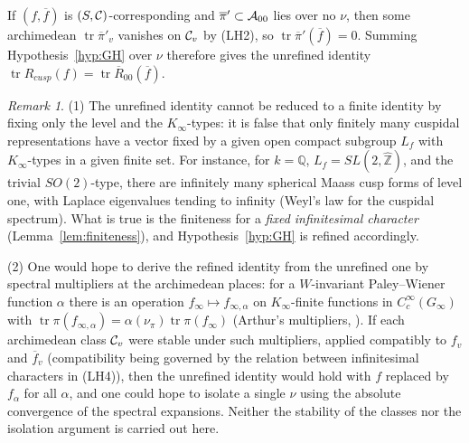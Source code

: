\documentclass[12pt,letterpaper,openany]{book}
\theoremstyle{plain}
\theoremstyle{definition}
\theoremstyle{remark}
\newtheorem{remark}[theorem]{Remark}
\theoremstyle{remark}
\newcommand{\tr}{\operatorname{tr}}
\begin{document}
If $(f,\overline f)$ is $(S,{\cal C})$-corresponding and
$\overline\pi'\subset{\cal A}_{00}$
lies over no $\nu$, then some archimedean $\tr\overline\pi'_v$ vanishes on
${\cal C}_v$ by (LH2), so $\tr\overline\pi'(\overline f)=0$. Summing
Hypothesis~\ref{hyp:GH} over $\nu$ therefore gives
the unrefined identity $\tr R_{cusp}(f)=\tr\overline R_{00}(\overline f)$.

\begin{remark}\label{rem:why-refine}
(1) The unrefined identity cannot be reduced to a finite identity by
fixing only the level and the $K_\infty$-types: it is false that only
finitely many cuspidal representations have a vector fixed by a given
open compact subgroup $L_f$ with $K_\infty$-types in a given finite set.
For instance, for $k={\mathbb Q}$, $L_f=SL(2,\widehat{\mathbb Z})$, and the
trivial $SO(2)$-type, there are infinitely many spherical Maass cusp forms
of level one, with Laplace eigenvalues tending to infinity (Weyl's law
for the cuspidal spectrum). What is true is the finiteness for a
\emph{fixed infinitesimal character} (Lemma~\ref{lem:finiteness}), and
Hypothesis~\ref{hyp:GH} is refined accordingly.

(2) One would hope to derive the refined identity from the unrefined one
by spectral multipliers at the archimedean places: for a $W$-invariant
Paley--Wiener function $\alpha$ there is an operation
$f_\infty\mapsto f_{\infty,\alpha}$ on $K_\infty$-finite functions in
$C_c^\infty(G_\infty)$ with $\tr\pi(f_{\infty,\alpha})=\alpha(\nu_\pi)\tr\pi(f_\infty)$
(Arthur's multipliers, \cite{APW}). If each archimedean class ${\cal C}_v$
were stable under such multipliers, applied compatibly to $f_v$ and
$\overline f_v$ (compatibility being governed by the relation between
infinitesimal characters in (LH4)), then the unrefined identity would hold
with $f$ replaced by $f_\alpha$ for all $\alpha$, and one could hope to
isolate a single $\nu$ using the absolute convergence of the spectral
expansions. Neither the stability of the classes nor the isolation
argument is carried out here.
\end{remark}
\end{document}
